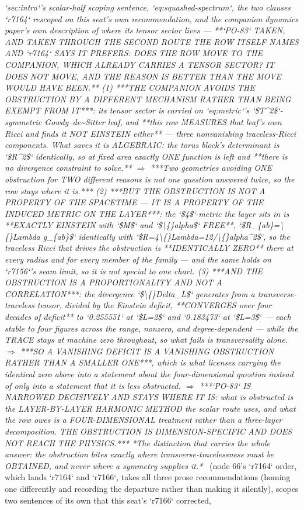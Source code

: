 \begin{description}
\textit{`sec:intro`'s scalar-half scoping sentence, `eq:squashed-spectrum`, the two clauses `r7164` rescoped on this seat's own recommendation, and the companion dynamics paper's own description of where its tensor sector lives ---  **`PO-83` TAKEN, AND TAKEN THROUGH THE SECOND ROUTE THE ROW ITSELF NAMES AND `r7164` SAYS IT PREFERS: DOES THE ROW MOVE TO THE COMPANION, WHICH ALREADY CARRIES A TENSOR SECTOR?  IT DOES NOT MOVE, AND THE REASON IS BETTER THAN THE MOVE WOULD HAVE BEEN.** (1) ***THE COMPANION AVOIDS THE OBSTRUCTION BY A DIFFERENT MECHANISM RATHER THAN BEING EXEMPT FROM IT***: its tensor sector is carried on `eq:metric`'s `\$T\textasciicircum{}2\$`-symmetric Gowdy--de\textasciitilde{}Sitter leaf, and **this row MEASURES that leaf's own Ricci and finds it NOT EINSTEIN either** --- three nonvanishing traceless-Ricci components. What saves it is ALGEBRAIC: the torus block's determinant is `\$R\textasciicircum{}2\$` identically, so at fixed area exactly ONE function is left and **there is no divergence constraint to solve.** \ensuremath{\Rightarrow} ***Two geometries avoiding ONE obstruction for TWO different reasons is not one question answered twice, so the row stays where it is.*** (2) ***BUT THE OBSTRUCTION IS NOT A PROPERTY OF THE SPACETIME --- IT IS A PROPERTY OF THE INDUCED METRIC ON THE LAYER***: the `\$4\$`-metric the layer sits in is **EXACTLY EINSTEIN with `\$M\$` and `\$\textbackslash\{\}alpha\$` FREE**, `\$R\_\{ab\}=\textbackslash\{\}Lambda g\_\{ab\}\$` identically with `\$R=4\textbackslash\{\}Lambda=12/\textbackslash\{\}alpha\textasciicircum{}2\$`, so the traceless Ricci that drives the obstruction is **IDENTICALLY ZERO** there at every radius and for every member of the family --- and the same holds on `r7156`'s seam limit, so it is not special to one chart. (3) ***AND THE OBSTRUCTION IS A PROPORTIONALITY AND NOT A CORRELATION***: the divergence `\$\textbackslash\{\}Delta\_L\$` generates from a transverse-traceless tensor, divided by the Einstein deficit, **CONVERGES over four decades of deficit** to `0.255551` at `\$L=2\$` and `0.183473` at `\$L=3\$` --- each stable to four figures across the range, nonzero, and degree-dependent --- while the TRACE stays at machine zero throughout, so what fails is transversality alone. \ensuremath{\Rightarrow} ***SO A VANISHING DEFICIT IS A VANISHING OBSTRUCTION RATHER THAN A SMALLER ONE***, which is what licenses carrying the identical zero above into a statement about the four-dimensional question instead of only into a statement that it is less obstructed.  \ensuremath{\Rightarrow} ***`PO-83` IS NARROWED DECISIVELY AND STAYS WHERE IT IS: what is obstructed is the LAYER-BY-LAYER HARMONIC METHOD the scalar route uses, and what the row owes is a FOUR-DIMENSIONAL treatment rather than a three-layer decomposition. THE OBSTRUCTION IS DIMENSION-SPECIFIC AND DOES NOT REACH THE PHYSICS.***  *The distinction that carries the whole answer: the obstruction bites exactly where transverse-tracelessness must be OBTAINED, and never where a symmetry supplies it.*} \ (node 66's `r7164` order, which lands `r7164` and `r7166`, takes all three prose recommendations (homing one differently and recording the departure rather than making it silently), scopes two sentences of its own that this seat's `r7166` corrected, 
\end{description}
